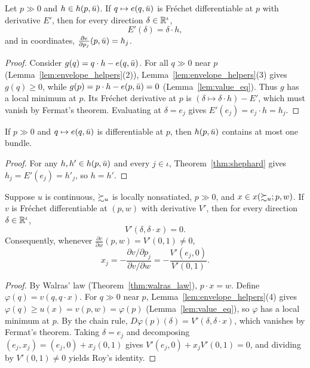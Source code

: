 \begin{theorem}
\label{thm:shephard}
\leanok
{}
Let $p \gg 0$ and $h \in h(p, \bar{u})$. If $q \mapsto e(q, \bar{u})$ is Fr\'echet differentiable
at $p$ with derivative $E'$, then for every direction $\delta \in \mathbb{R}^\iota$,
\[
  E'(\delta) = \delta \cdot h,
\]
and in coordinates, $\frac{\partial e}{\partial p_j}(p, \bar{u}) = h_j$.
\end{theorem}
\begin{proof}
\leanok
Consider $g(q) = q \cdot h - e(q, \bar{u})$. For all $q \gg 0$ near $p$
(Lemma~\ref{lem:envelope_helpers}(2)), Lemma~\ref{lem:envelope_helpers}(3) gives
$g(q) \ge 0$, while $g(p) = p \cdot h - e(p, \bar{u}) = 0$ (Lemma~\ref{lem:value_eq}).
Thus $g$ has a local minimum at $p$. Its Fr\'echet derivative at $p$ is
$(\delta \mapsto \delta \cdot h) - E'$, which must vanish by Fermat's theorem.
Evaluating at $\delta = e_j$ gives $E'(e_j) = e_j \cdot h = h_j$.
\end{proof}

\begin{corollary}
\label{thm:hicksian_unique}
\leanok
{}
If $p \gg 0$ and $q \mapsto e(q, \bar{u})$ is differentiable at $p$, then $h(p, \bar{u})$
contains at most one bundle.
\end{corollary}
\begin{proof}
\leanok
For any $h, h' \in h(p, \bar{u})$ and every $j \in \iota$, Theorem~\ref{thm:shephard} gives
$h_j = E'(e_j) = h'_j$, so $h = h'$.
\end{proof}

\begin{theorem}
\label{thm:roy}
\leanok
{}
Suppose $u$ is continuous, $\succsim_u$ is locally nonsatiated, $p \gg 0$, and
$x \in x(\succsim_u; p, w)$. If $v$ is Fr\'echet differentiable at $(p, w)$ with derivative
$V'$, then for every direction $\delta \in \mathbb{R}^\iota$,
\[
  V'(\delta, \delta \cdot x) = 0.
\]
Consequently, whenever $\frac{\partial v}{\partial w}(p, w) = V'(0, 1) \ne 0$,
\[
  x_j = -\frac{\partial v / \partial p_j}{\partial v / \partial w}
      = -\frac{V'(e_j, 0)}{V'(0, 1)}.
\]
\end{theorem}
\begin{proof}
\leanok
By Walras' law (Theorem~\ref{thm:walras_law}), $p \cdot x = w$. Define
$\varphi(q) = v(q, q \cdot x)$. For $q \gg 0$ near $p$, Lemma~\ref{lem:envelope_helpers}(4)
gives $\varphi(q) \ge u(x) = v(p, w) = \varphi(p)$ (Lemma~\ref{lem:value_eq}), so $\varphi$
has a local minimum at $p$. By the chain rule, $D\varphi(p)(\delta) = V'(\delta, \delta \cdot x)$,
which vanishes by Fermat's theorem. Taking $\delta = e_j$ and decomposing
$(e_j, x_j) = (e_j, 0) + x_j(0, 1)$ gives $V'(e_j, 0) + x_j V'(0, 1) = 0$, and dividing
by $V'(0, 1) \ne 0$ yields Roy's identity.
\end{proof}

